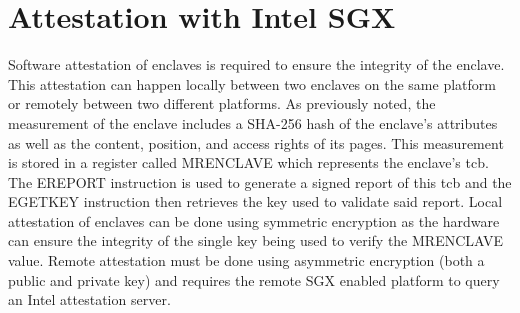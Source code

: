 \section{Attestation with Intel SGX}
Software attestation of enclaves is required to ensure the integrity of the enclave. This attestation can happen locally between two enclaves on the same platform or remotely between two different platforms. As previously noted, the measurement of the enclave includes a SHA-256 hash of the enclave's attributes as well as the content, position, and access rights of its pages. This measurement is stored in a register called MRENCLAVE which represents the enclave's \gls{tcb}. The EREPORT instruction is used to generate a signed report of this \gls{tcb} and the EGETKEY instruction then retrieves the key used to validate said report. Local attestation of enclaves can be done using symmetric encryption as the hardware can ensure the integrity of the single key being used to verify the MRENCLAVE value. Remote attestation must be done using asymmetric encryption (both a public and private key) and requires the remote SGX enabled platform to query an Intel attestation server. 